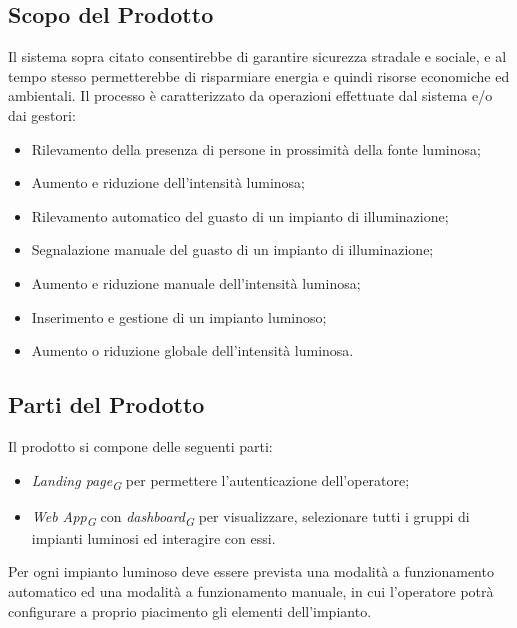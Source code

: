 \documentclass[a4paper, 12pt]{article}
\begin{document}
\subsection{Scopo del Prodotto}
Il sistema sopra citato consentirebbe di garantire sicurezza stradale e sociale, e al tempo stesso permetterebbe di risparmiare energia e quindi risorse economiche ed ambientali. Il processo è caratterizzato da operazioni effettuate dal sistema e/o dai gestori:
\begin{itemize}
    \item Rilevamento della presenza di persone in prossimità della fonte luminosa;
    \item Aumento e riduzione dell'intensità luminosa;
    \item Rilevamento automatico del guasto di un impianto di illuminazione;
    \item Segnalazione manuale del guasto di un impianto di illuminazione;
    \item Aumento e riduzione manuale dell'intensità luminosa;
    \item Inserimento e gestione di un impianto luminoso;
    \item Aumento o riduzione globale dell'intensità luminosa. 
\end{itemize}

\subsection{Parti del Prodotto}
Il prodotto si compone delle seguenti parti: %
\begin{itemize}
    \item \textit{Landing page\textsubscript{G}} per permettere l'autenticazione dell'operatore;
    \item \textit{Web App\textsubscript{G}} con \textit{dashboard\textsubscript{G}} per visualizzare, selezionare tutti i gruppi di
    impianti luminosi ed interagire con essi.
\end{itemize}
Per ogni impianto luminoso deve essere prevista una modalità a funzionamento
automatico ed una modalità a funzionamento manuale, in cui l'operatore potrà
configurare a proprio piacimento gli elementi dell'impianto. 
\end{document}

